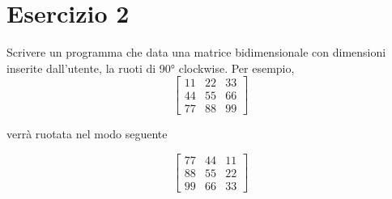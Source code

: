 \documentclass{article}
\begin{document}
    \newpage

\section*{Esercizio 2}

Scrivere un programma che data una matrice bidimensionale con dimensioni inserite dall'utente, la ruoti di 90° clockwise. Per esempio,
    \[
    \begin{bmatrix}
        11 & 22 & 33\\
        44 & 55 & 66\\
        77 & 88 & 99
    \end{bmatrix} \]
    
    \noindent verrà ruotata nel modo seguente
    
    \[
    \begin{bmatrix}
        77 & 44 & 11\\
        88 & 55 & 22\\
        99 & 66 & 33
    \end{bmatrix} \]
\end{document}

